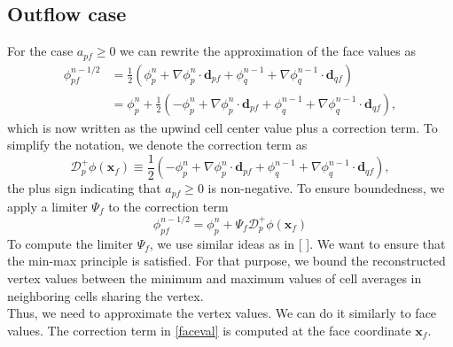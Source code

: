 \documentclass{article}
\begin{document}
\subsection{Outflow case}
For the case $ a_{pf} \geq 0 $ we can rewrite the approximation of the face values as
\begin{equation}
	\label{faceval}
	\begin{split}
		\phi_{pf}^{n-1/2}
		&= \frac{1}{2}(\phi_p^n + \nabla\phi_p^n\cdot\boldsymbol{d}_{pf} +
		\phi_q^{n-1} + \nabla\phi_q^{n-1}\cdot\boldsymbol{d}_{qf}) \\
		&= \phi_p^n + \frac{1}{2}(-\phi_p^n + \nabla\phi_p^n\cdot\boldsymbol{d}_{pf} +
		\phi_q^{n-1} + \nabla\phi_q^{n-1}\cdot\boldsymbol{d}_{qf}),
	\end{split}
\end{equation}
which is now written as the upwind cell center value plus a correction term.
To simplify the notation, we denote the correction term as
\[
	\mathcal{D}^+_p\phi(\boldsymbol{x}_f)
	\equiv
	\frac{1}{2}(-\phi_p^n + \nabla\phi_p^n\cdot\boldsymbol{d}_{pf} +
	\phi_q^{n-1} + \nabla\phi_q^{n-1}\cdot\boldsymbol{d}_{qf}),
\]
the plus sign indicating that $ a_{pf} \geq 0 $ is non-negative.
To ensure boundedness, we apply a limiter $ \Psi_{f} $ to the correction term
\begin{equation} \label{rec_face}
	\phi_{pf}^{n-1/2} = \phi_p^n + \Psi_{f} \mathcal{D}^+_p\phi(\boldsymbol{x}_f)
\end{equation}
To compute the limiter $ \Psi_{f} $, we use similar ideas as in [ ].
We want to ensure that the min-max principle is satisfied.
For that purpose, we bound the reconstructed vertex values
between the minimum and maximum values of cell averages in neighboring cells sharing the vertex.\\
Thus, we need to approximate the vertex values. We can do it similarly to face values.
The correction term in \eqref{faceval} is computed at the face coordinate $ \boldsymbol{x}_f $.
\end{document}
